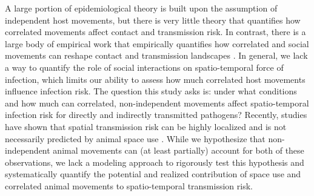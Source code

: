 \documentclass[letterpaper]{article}
\begin{document}
A large portion of epidemiological theory is built upon the assumption of independent host movements, but there is very little theory that quantifies how correlated movements affect contact and transmission risk. In contrast, there is a large body of empirical work that empirically quantifies how correlated and social movements can reshape contact and transmission landscapes \citep[e.g.,][]{Kjaer2008,Grear2010,Schauber2015a}. In general, we lack a way to quantify the role of social interactions on spatio-temporal force of infection, which limits our ability to assess how much correlated host movements influence infection risk. The question this study asks is: under what conditions and how much can correlated, non-independent movements affect spatio-temporal infection risk for directly and indirectly transmitted pathogens? Recently, studies have shown that spatial transmission risk can be highly localized \citep{Albery2021} and is not necessarily predicted by animal space use \citep{Yang2023a}. While we hypothesize that non-independent animal movements can (at least partially) account for both of these observations, we lack a modeling approach to rigorously test this hypothesis and systematically quantify the potential and realized contribution of space use and correlated animal movements to spatio-temporal transmission risk.  

\end{document}
